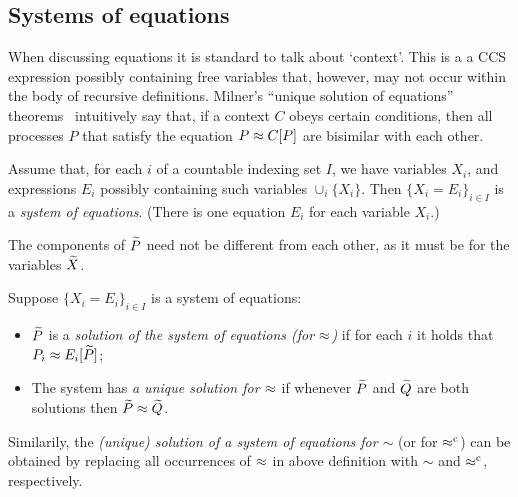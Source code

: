 \subsection{Systems of equations}
\label{ss:SysEq}
When discussing equations it is standard to talk about `context'. This is a 
 a CCS expression  possibly containing  free variables that, however, may not occur within
the body of recursive definitions. 
Milner's ``unique solution of equations'' theorems~\cite{Mil89} intuitively
say that, if a context $C$
obeys certain conditions,
then all processes $P$ that satisfy the equation $P \approx C [P]$ are
bisimilar with each other.

\begin{definition}[equations] %
  \label{def:equation}
Assume that, for each $i$ of 
 a countable indexing set $I$, we have variables $X_i$, and expressions
$E_i$ possibly containing such variables $\cup_i \{ X_i\}$. Then 
$\{ X_i = E_i\}_{i\in I}$ is 
  a \emph{system of equations}. (There is one equation $E_i$ for each variable $X_i$.)
\end{definition}

The components of $\widetilde P$ need not be
different from each other, as it must be for the variables $\widetilde X$.

\begin{definition}
  \label{def:solution}
Suppose $\{ X_i = E_i\}_{i\in I}$ is a system of equations: 
\begin{itemize}
\item
 $\widetilde P$ is a \emph{solution of the system of equations (for $\approx$)} 
if for each $i$ it holds that $P_i \approx E_i [\widetilde P]$;
\item The system has \emph{a unique solution for $\approx$}  if whenever 
 $\widetilde P$ and $\widetilde Q$ are both solutions then $\widetilde P \approx \widetilde Q$. 
\end{itemize} 
 \end{definition}
Similarily, the \emph{(unique) solution of a system of equations for $\sim$}
(or for $\mathrel{\approx^{\rm{c}}}$) can be obtained by replacing all occurrences of $\approx$
in above definition with $\sim$ and $\mathrel{\approx^{\rm{c}}}$, respectively.


